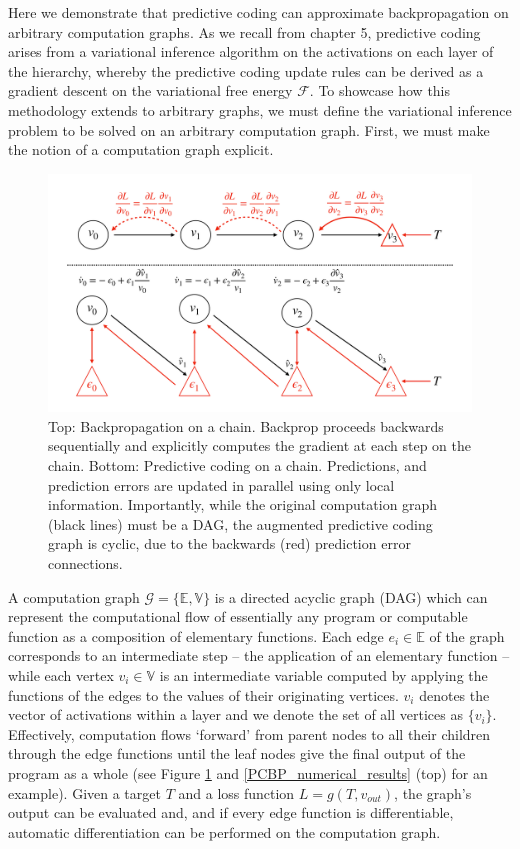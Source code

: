 Here we demonstrate that predictive coding can approximate backpropagation on arbitrary computation graphs. As we recall from chapter 5, predictive coding arises from a variational inference algorithm on the activations on each layer of the hierarchy, whereby the predictive coding update rules can be derived as a gradient descent on the variational free energy $\mathcal{F}$. To showcase how this methodology extends to arbitrary graphs, we must define the variational inference problem to be solved on an arbitrary computation graph. First, we must make the notion of a computation graph explicit. 

\begin{figure}[ht]
    \centering
    \includegraphics[width=\textwidth]{chapter_6_figures/pc_chain_schematic_new.pdf}
    \caption{Top: Backpropagation on a chain. Backprop proceeds backwards sequentially and  explicitly computes the gradient at each step on the chain. Bottom: Predictive coding on a chain.  Predictions, and prediction errors are updated in parallel using only local information. Importantly, while the original computation graph (black lines) must be a DAG, the augmented predictive coding graph is cyclic, due to the backwards (red) prediction error connections.}
\label{main_PCBP_schematic}
\end{figure}

A computation graph $\mathcal{G} = \{\mathbb{E},\mathbb{V}\}$ is a directed acyclic graph (DAG) which can represent the computational flow of essentially any program or computable function as a composition of elementary functions. Each edge $e_i \in \mathbb{E}$ of the graph corresponds to an intermediate step -- the application of an elementary function -- while each vertex $v_i \in \mathbb{V}$ is an intermediate variable computed by applying the functions of the edges to the values of their originating vertices. $v_i$ denotes the vector of activations within a layer and we denote the set of all vertices as $\{v_i\}$. Effectively, computation flows `forward' from parent nodes to all their children through the edge functions until the leaf nodes give the final output of the program as a whole (see Figure \ref{main_PCBP_schematic} and \ref{PCBP_numerical_results} (top) for an example). Given a target $T$ and a loss function $L = g(T, v_{out})$, the graph's output can be evaluated and, and if every edge function is differentiable, automatic differentiation can be performed on the computation graph.

